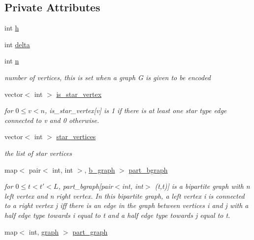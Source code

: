 \subsection*{Private Attributes}
\begin{DoxyCompactItemize}
\item 
int \hyperlink{classmarked__graph__decoder_a15bb3109398ce7c1f0ffbfae512e34c9}{h}
\item 
int \hyperlink{classmarked__graph__decoder_a779d91c4c405b82baf0a3374401be0a2}{delta}
\item 
int \hyperlink{classmarked__graph__decoder_aefc93611bc4a3e9a5d3956d97649a0e9}{n}
\begin{DoxyCompactList}\small\item\em number of vertices, this is set when a graph G is given to be encoded \end{DoxyCompactList}\item 
vector$<$ int $>$ \hyperlink{classmarked__graph__decoder_a5c5391206cf2965b8513248e505ba48f}{is\+\_\+star\+\_\+vertex}
\begin{DoxyCompactList}\small\item\em for $0 \leq v < n$, is\+\_\+star\+\_\+vertex\mbox{[}v\mbox{]} is 1 if there is at least one star type edge connected to v and 0 otherwise. \end{DoxyCompactList}\item 
vector$<$ int $>$ \hyperlink{classmarked__graph__decoder_a06fc05827db14b675f7ecc2fd915b533}{star\+\_\+vertices}
\begin{DoxyCompactList}\small\item\em the list of star vertices \end{DoxyCompactList}\item 
map$<$ pair$<$ int, int $>$, \hyperlink{classb__graph}{b\+\_\+graph} $>$ \hyperlink{classmarked__graph__decoder_a6be777b8c1e1b02ce79b5081056794ae}{part\+\_\+bgraph}
\begin{DoxyCompactList}\small\item\em for $0 \leq t < t' < L$, part\+\_\+bgraph\mbox{[}pair$<$int, int$>$ (t,t\textquotesingle{})\mbox{]} is a bipartite graph with n left vertex and n right vertex. In this bipartite graph, a left vertex i is connected to a right vertex j iff there is an edge in the graph between vertices i and j with a half edge type towards i equal to t and a half edge type towards j equal to t\textquotesingle{}. \end{DoxyCompactList}\item 
map$<$ int, \hyperlink{classgraph}{graph} $>$ \hyperlink{classmarked__graph__decoder_a7c4e5c397ad8adf0168f44d695857403}{part\+\_\+graph}

\end{DoxyCompactItemize}
